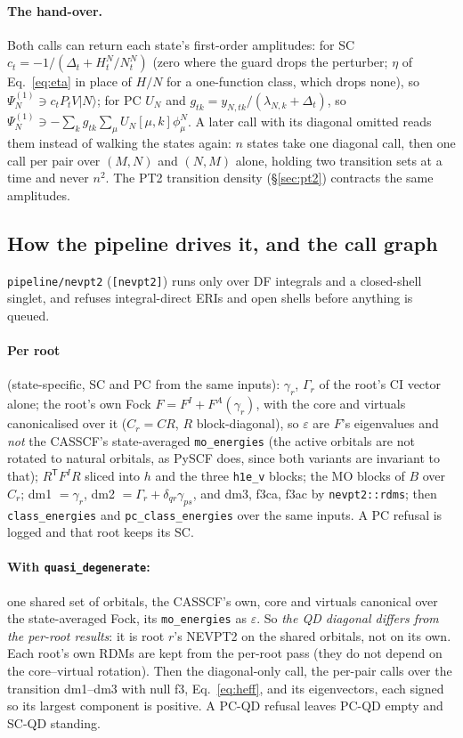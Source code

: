 \documentclass[11pt]{article}
\newcommand{\code}[1]{\texttt{#1}}
\newcommand{\eps}{\varepsilon}
\newcommand{\T}{\mathsf T}
\begin{document}
\paragraph{The hand-over.} Both calls can return each state's first-order
amplitudes: for SC $c_t = -1/(\Delta_t + H^N_t/N^N_t)$ (zero where the guard
drops the perturber; $\eta$ of Eq.~\eqref{eq:eta} in place of $H/N$ for a
one-function class, which drops none), so $\Psi^{(1)}_N \ni c_t P_t V|N\rangle$; for PC $U_N$
and $g_{tk} = y_{N,tk}/(\lambda_{N,k}+\Delta_t)$, so $\Psi^{(1)}_N \ni
-\sum_k g_{tk}\sum_\mu U_N[\mu,k]\phi^N_\mu$. A later call with its
diagonal omitted reads them instead of walking the states again: $n$ states
take one diagonal call, then one call per pair over $(M,N)$ and $(N,M)$
alone, holding two transition sets at a time and never $n^2$. The PT2
transition density (\S\ref{sec:pt2}) contracts the same amplitudes.

\subsection{How the pipeline drives it, and the call graph}
\label{sec:dag}

\code{pipeline/nevpt2} (\code{[nevpt2]}) runs only over DF integrals and a
closed-shell singlet, and refuses integral-direct ERIs and open shells before
anything is queued.

\paragraph{Per root} (state-specific, SC and PC from the same inputs):
$\gamma_r$, $\Gamma_r$ of the root's CI vector alone; the root's own Fock
$F = F^I + F^A(\gamma_r)$, with the core and virtuals canonicalised over it
($C_r = CR$, $R$ block-diagonal), so $\eps$ are $F$'s eigenvalues and
\emph{not} the CASSCF's state-averaged \code{mo\_energies} (the active
orbitals are not rotated to natural orbitals, as PySCF does, since both
variants are invariant to that); $R^\T F^I R$ sliced into $h$ and the three
\code{h1e\_v} blocks; the MO blocks of $B$ over $C_r$; dm1 $=\gamma_r$,
dm2 $=\Gamma_r + \delta_{qr}\gamma_{ps}$, and dm3, f3ca, f3ac by
\code{nevpt2::rdms}; then \code{class\_energies} and
\code{pc\_class\_energies} over the same inputs. A PC refusal is logged and
that root keeps its SC.

\paragraph{With \code{quasi\_degenerate}:} one shared set of orbitals, the
CASSCF's own, core and virtuals canonical over the state-averaged Fock, its
\code{mo\_energies} as $\eps$. So \emph{the QD diagonal differs from the
per-root results}: it is root $r$'s NEVPT2 on the shared orbitals, not on
its own. Each root's own RDMs are kept from the per-root pass (they do not
depend on the core--virtual rotation). Then the diagonal-only call, the
per-pair calls over the transition dm1--dm3 with null f3,
Eq.~\eqref{eq:heff}, and its eigenvectors, each signed so its largest
component is positive. A PC-QD refusal leaves PC-QD empty and SC-QD
standing.
\end{document}

